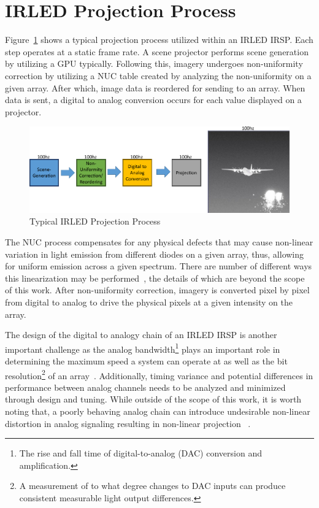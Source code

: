 \section{IRLED Projection Process}
    Figure~\ref{fig:typical_projection} shows a typical projection process utilized within an IRLED IRSP. Each step operates at a static frame rate. A scene projector performs scene generation by utilizing a GPU typically. Following this, imagery undergoes non-uniformity correction by utilizing a NUC table created by analyzing the non-uniformity on a given array. After which, image data is reordered for sending to an array. When data is sent, a digital to analog conversion occurs for each value displayed on a projector.

    \begin{figure}
        \centering
        \includegraphics[width=1.0\textwidth]{fig/typical_projection_system.pdf}
        \caption{Typical IRLED Projection Process}
        \label{fig:typical_projection}
    \end{figure}

    The NUC process compensates for any physical defects that may cause non-linear variation in light emission from different diodes on a given array, thus, allowing for uniform emission across a given spectrum. There are number of different ways this linearization may be performed~\cite{BrowningEtAl2016, LandwehrEtAl2017, BarakhshanEtAl2018_2, BarakhshanEtAl2019, BarakhshanEtAl2019_2}, the details of which are beyond the scope of this work. After non-uniformity correction, imagery is converted pixel by pixel from digital to analog to drive the physical pixels at a given intensity on the array.

    The design of the digital to analogy chain of an IRLED IRSP is another important challenge as the analog bandwidth\footnote{The rise and fall time of digital-to-analog (DAC) conversion and amplification.} plays an important role in determining the maximum speed a system can operate at as well as the bit resolution\footnote{A measurement of to what degree changes to DAC inputs can produce consistent measurable light output differences.} of an array~\cite{EjzakEtAl2019}. Additionally, timing variance and potential differences in performance between analog channels needs to be analyzed and minimized through design and tuning. While outside of the scope of this work, it is worth noting that, a poorly behaving analog chain can introduce undesirable non-linear distortion in analog signaling resulting in non-linear projection ~\cite{Freeman1977, Gordon1978, ChanEtAl2008}.

